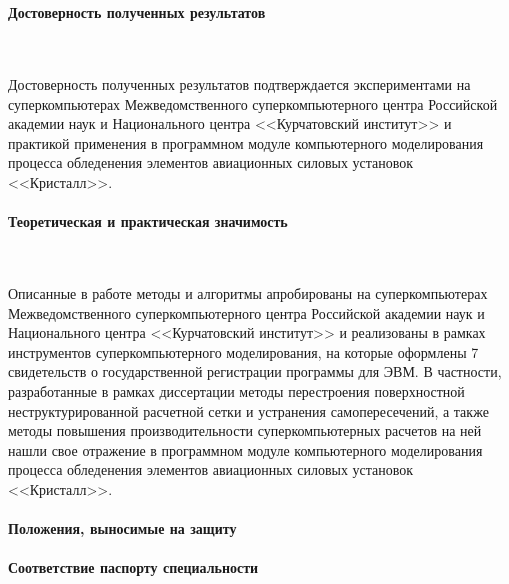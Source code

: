 \documentclass[a4paper,14pt]{extarticle}                     %
\theoremstyle{plain}                                         %
\begin{document}
\

\begin{itemize}[noitemsep,topsep=0pt,parsep=0pt,partopsep=0pt]

\end{itemize}

\paragraph{Достоверность полученных результатов}

\

Достоверность полученных результатов подтверждается экспериментами на суперкомпьютерах Межведомственного суперкомпьютерного центра Российской академии наук и Национального центра <<Курчатовский институт>> и практикой применения в программном модуле компьютерного моделирования процесса обледенения элементов авиационных силовых установок <<Кристалл>>.

\paragraph{Теоретическая и практическая значимость}

\



Описанные в работе методы и алгоритмы апробированы на суперкомпьютерах Межведомственного суперкомпьютерного центра Российской академии наук и Национального центра <<Курчатовский институт>> и реализованы в рамках инструментов суперкомпьютерного моделирования, на которые оформлены 7 свидетельств о государственной регистрации программы для ЭВМ.
В частности, разработанные в рамках диссертации методы перестроения поверхностной неструктурированной расчетной сетки и устранения самопересечений, а также методы повышения производительности суперкомпьютерных расчетов на ней нашли свое отражение в программном модуле компьютерного моделирования процесса обледенения элементов авиационных силовых установок <<Кристалл>>.

\paragraph{Положения, выносимые на защиту}
\begin{enumerate}[noitemsep,topsep=0pt,parsep=0pt,partopsep=0pt]

\end{enumerate}

\paragraph{Соответствие паспорту специальности}
\end{document}
